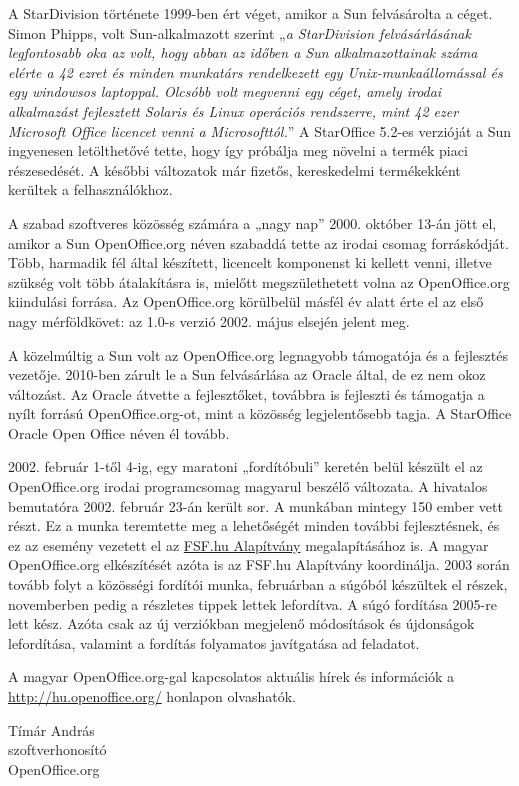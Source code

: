 A StarDivision története 1999-ben ért véget, amikor a Sun felvásárolta a céget. Simon Phipps, volt Sun-alkalmazott szerint „{\em a StarDivision felvásárlásának legfontosabb oka az volt, hogy abban az időben a Sun alkalmazottainak száma elérte a 42 ezret és minden munkatárs rendelkezett egy Unix-munkaállomással és egy windowsos laptoppal. Olcsóbb volt megvenni egy céget, amely irodai alkalmazást fejlesztett Solaris és Linux operációs rendszerre, mint 42 ezer Microsoft Office licencet venni a Microsofttól.}” A StarOffice 5.2-es verzióját a Sun ingyenesen letölthetővé tette, hogy így próbálja meg növelni a termék piaci részesedését. A későbbi változatok már fizetős, kereskedelmi termékekként kerültek a felhasználókhoz.

\smallskip

A szabad szoftveres közösség számára a „nagy nap” 2000. október 13-án jött el, amikor a Sun OpenOffice.org néven szabaddá tette az irodai csomag forráskódját. Több, harmadik fél által készített, licencelt komponenst ki kellett venni, illetve szükség volt több átalakításra is, mielőtt megszülethetett volna az OpenOffice.org kiindulási forrása. Az OpenOffice.org körülbelül másfél év alatt érte el az első nagy mérföldkövet: az 1.0-s verzió 2002. május elsején jelent meg.

\smallskip

A közelmúltig a Sun volt az OpenOffice.org legnagyobb támogatója és a fejlesztés vezetője. 2010-ben zárult le a Sun felvásárlása az Oracle által, de ez nem okoz változást. Az Oracle átvette a fejlesztőket, továbbra is fejleszti és támogatja a nyílt forrású OpenOffice.org-ot, mint a közösség legjelentősebb tagja. A StarOffice Oracle Open Office néven él tovább.

\smallskip


2002. február 1-től 4-ig, egy maratoni „fordítóbuli” keretén belül készült el az OpenOffice.org irodai programcsomag magyarul beszélő változata. A hivatalos bemutatóra 2002. február 23-án került sor. A munkában mintegy 150 ember vett részt. Ez a munka teremtette meg a lehetőségét minden további fejlesztésnek, és ez az esemény vezetett el az \href{http://www.fsf.hu}{FSF.hu Alapítvány} megalapításához is. A magyar OpenOffice.org elkészítését azóta is az FSF.hu Alapítvány koordinálja. 2003 során tovább folyt a közösségi fordítói munka, februárban a súgóból készültek el részek, novemberben pedig a részletes tippek lettek lefordítva. A súgó fordítása 2005-re lett kész. Azóta csak az új verziókban megjelenő módosítások és újdonságok lefordítása, valamint a fordítás folyamatos javítgatása ad feladatot.

\smallskip

A magyar OpenOffice.org-gal kapcsolatos aktuális hírek és információk a \url{http://hu.openoffice.org/} honlapon olvashatók.
\vfill
\begin{flushright}
Tímár András\\
szoftverhonosító\\
OpenOffice.org
\end{flushright}
\normalsize


